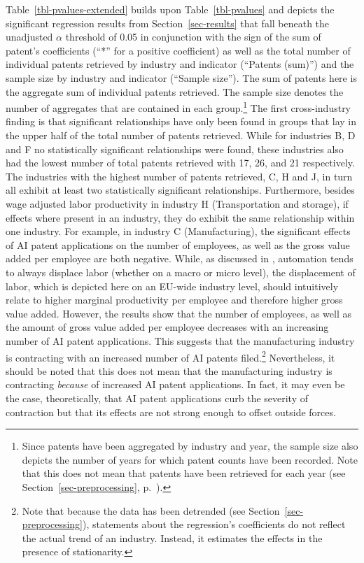 \documentclass[
  12pt,
  a4paperpaper,
]{article}
\begin{document}
Table~\ref{tbl-pvalues-extended} builds upon Table~\ref{tbl-pvalues} and
depicts the significant regression results from
Section~\ref{sec-results} that fall beneath the unadjusted \(\alpha\)
threshold of 0.05 in conjunction with the sign of the sum of patent's
coefficients (``*'' for a positive coefficient) as well as the total
number of individual patents retrieved by industry and indicator
(``Patents (sum)'') and the sample size by industry and indicator
(``Sample size''). The sum of patents here is the aggregate sum of
individual patents retrieved. The sample size denotes the number of
aggregates that are contained in each group.\footnote{Since patents have
  been aggregated by industry and year, the sample size also depicts the
  number of years for which patent counts have been recorded. Note that
  this does not mean that patents have been retrieved for each year (see
  Section~\ref{sec-preprocessing},
  p.~\pageref{cleaning-missing-values}).} The first cross-industry
finding is that significant relationships have only been found in groups
that lay in the upper half of the total number of patents retrieved.
While for industries B, D and F no statistically significant
relationships were found, these industries also had the lowest number of
total patents retrieved with 17, 26, and 21 respectively. The industries
with the highest number of patents retrieved, C, H and J, in turn all
exhibit at least two statistically significant relationships.
Furthermore, besides wage adjusted labor productivity in industry H
(Transportation and storage), if effects where present in an industry,
they do exhibit the same relationship within one industry. For example,
in industry C (Manufacturing), the significant effects of AI patent
applications on the number of employees, as well as the gross value
added per employee are both negative. While, as discussed in
, automation tends to always displace labor
(whether on a macro or micro level), the displacement of labor, which is
depicted here on an EU-wide industry level, should intuitively relate to
higher marginal productivity per employee and therefore higher gross
value added. However, the results show that the number of employees, as
well as the amount of gross value added per employee decreases with an
increasing number of AI patent applications. This suggests that the
manufacturing industry is contracting with an increased number of AI
patents filed.\footnote{Note that because the data has been detrended
  (see Section~\ref{sec-preprocessing}), statements about the
  regression's coefficients do not reflect the actual trend of an
  industry. Instead, it estimates the effects in the presence of
  stationarity.} Nevertheless, it should be noted that this does not
mean that the manufacturing industry is contracting \emph{because} of
increased AI patent applications. In fact, it may even be the case,
theoretically, that AI patent applications curb the severity of
contraction but that its effects are not strong enough to offset outside
forces.
\end{document}
